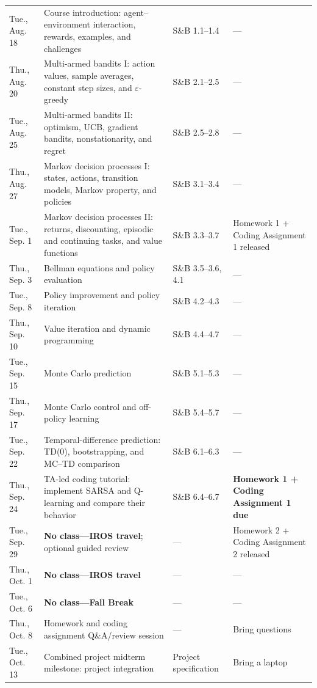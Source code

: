 \documentclass[11pt]{article}
\begin{document}
\begin{longtable}{@{}>{\raggedright\arraybackslash}p{0.72in} >{\raggedright\arraybackslash}p{2.30in} >{\raggedright\arraybackslash}p{1.05in} >{\raggedright\arraybackslash}p{2.05in}@{}}
Tue., Aug. 18 & Course introduction: agent--environment interaction, rewards, examples, and challenges & S\&B 1.1--1.4 & --- \\
Thu., Aug. 20 & Multi-armed bandits I: action values, sample averages, constant step sizes, and $\varepsilon$-greedy & S\&B 2.1--2.5 & --- \\
Tue., Aug. 25 & Multi-armed bandits II: optimism, UCB, gradient bandits, nonstationarity, and regret & S\&B 2.5--2.8 & --- \\
Thu., Aug. 27 & Markov decision processes I: states, actions, transition models, Markov property, and policies & S\&B 3.1--3.4 & --- \\
Tue., Sep. 1 & Markov decision processes II: returns, discounting, episodic and continuing tasks, and value functions & S\&B 3.3--3.7 & Homework 1 + Coding Assignment 1 released \\
Thu., Sep. 3 & Bellman equations and policy evaluation & S\&B 3.5--3.6, 4.1 & --- \\
Tue., Sep. 8 & Policy improvement and policy iteration & S\&B 4.2--4.3 & --- \\
Thu., Sep. 10 & Value iteration and dynamic programming & S\&B 4.4--4.7 & --- \\
Tue., Sep. 15 & Monte Carlo prediction & S\&B 5.1--5.3 & --- \\
Thu., Sep. 17 & Monte Carlo control and off-policy learning & S\&B 5.4--5.7 & --- \\
Tue., Sep. 22 & Temporal-difference prediction: TD(0), bootstrapping, and MC--TD comparison & S\&B 6.1--6.3 & --- \\
\rowcolor{tutorialbg}
Thu., Sep. 24 & TA-led coding tutorial: implement SARSA and Q-learning and compare their behavior & S\&B 6.4--6.7 & \textbf{Homework 1 + Coding Assignment 1 due} \\
\rowcolor{noclassbg}
Tue., Sep. 29 & \textbf{No class---IROS travel}; optional guided review & --- & Homework 2 + Coding Assignment 2 released \\
\rowcolor{noclassbg}
Thu., Oct. 1 & \textbf{No class---IROS travel} & --- & --- \\
\rowcolor{noclassbg}
Tue., Oct. 6 & \textbf{No class---Fall Break} & --- & --- \\
\rowcolor{tutorialbg}
Thu., Oct. 8 & Homework and coding assignment Q\&A/review session & --- & Bring questions \\
\rowcolor{milestonebg}
Tue., Oct. 13 & Combined project midterm milestone: project integration & Project specification & Bring a laptop \\

\end{longtable}
\end{document}
